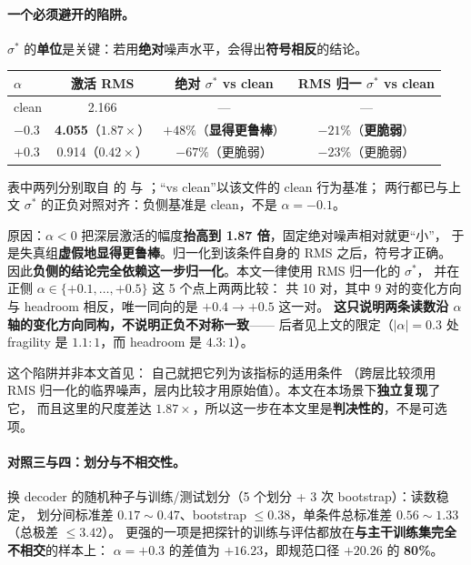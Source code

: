 \documentclass[11pt,a4paper]{ctexart}
\begin{document}
\paragraph{一个必须避开的陷阱。}
$\sigma^*$ 的\textbf{单位}是关键：若用\textbf{绝对}噪声水平，会得出\textbf{符号相反}的结论。

\begin{center}
\small
\begin{tabular}{lccc}
\toprule
$\alpha$ & 激活 RMS & 绝对 $\sigma^*$ vs clean & \textbf{RMS 归一} $\sigma^*$ vs clean \\
\midrule
clean & 2.166 & --- & --- \\
$-0.3$ & \textbf{4.055}（$1.87\times$） & $+48\%$（\textbf{显得更鲁棒}） & $-21\%$（\textbf{更脆弱}） \\
$+0.3$ & 0.914（$0.42\times$） & $-67\%$（更脆弱） & $-23\%$（更脆弱） \\
\bottomrule
\end{tabular}
\end{center}

\noindent 表中两列分别取自  的
 与 ；“vs clean”以该文件的 clean 行为基准；
两行都已与上文 $\sigma^*$ 的正负对照对齐：负侧基准是 clean，不是 $\alpha=-0.1$。

原因：$\alpha<0$ 把深层激活的幅度\textbf{抬高到 1.87 倍}，固定绝对噪声相对就更“小”，
于是失真组\textbf{虚假地显得更鲁棒}。归一化到该条件自身的 RMS 之后，符号才正确。
因此\textbf{负侧的结论完全依赖这一步归一化}。本文一律使用 RMS 归一化的 $\sigma^*$，
并在正侧 $\alpha\in\{+0.1,\dots,+0.5\}$ 这 5 个点上两两比较：
共 10 对，其中 9 对的变化方向与 headroom 相反，唯一同向的是 $+0.4\to+0.5$ 这一对。
\textbf{这只说明两条读数沿 $\alpha$ 轴的变化方向同构，不说明正负不对称一致}——
后者见上文的限定（$|\alpha|=0.3$ 处 fragility 是 $1.1:1$，而 headroom 是 $4.3:1$）。

这个陷阱并非本文首见：\cite{fragility} 自己就把它列为该指标的适用条件
（跨层比较须用 RMS 归一化的临界噪声，层内比较才用原始值）。本文在本场景下\textbf{独立复现}了它，
而且这里的尺度差达 $1.87\times$，所以这一步在本文里是\textbf{判决性的}，不是可选项。

\paragraph{对照三与四：划分与不相交性。}
换 decoder 的随机种子与训练/测试划分（5 个划分 + 3 次 bootstrap）：读数稳定，
划分间标准差 $0.17\sim0.47$、bootstrap $\le0.38$，单条件总标准差 $0.56\sim1.33$（总极差 $\le3.42$）。
更强的一项是把探针的训练与评估都放在\textbf{与主干训练集完全不相交}的样本上：
$\alpha=+0.3$ 的差值为 $\bm{+16.23}$，即规范口径 $+20.26$ 的 \textbf{80\%}。
\end{document}
